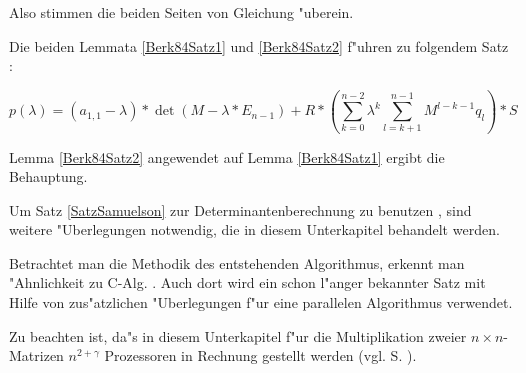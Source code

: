 \begin{beweis}
    Also stimmen die beiden Seiten von Gleichung 
    "uberein.
\end{beweis}

Die beiden Lemmata \ref{Berk84Satz1} und \ref{Berk84Satz2} f"uhren zu
folgendem Satz \cite{Samu42}:

\begin{satz}[Samuelson]
\label{SatzSamuelson}
    \begin{equation}
    \label{EquSatzSamuelson}
        p(\lambda) =
            (a_{1,1} - \lambda) * \det(M - \lambda * E_{n-1})
            + R * \left(
              \sum_{k=0}^{n-2} \lambda^{k} \sum_{l=k+1}^{n-1} M^{l-k-1} q_l
            \right) * S
    \end{equation}
\end{satz}
\begin{beweis}
    Lemma \ref{Berk84Satz2} angewendet auf Lemma \ref{Berk84Satz1}
    ergibt die Behauptung.
\end{beweis}


\label{SecAlgBerk}

Um Satz \ref{SatzSamuelson} zur Determinantenberechnung zu benutzen
\cite{Berk84}, sind weitere "Uberlegungen notwendig, die in diesem
Unterkapitel behandelt werden.

Betrachtet man die Methodik des entstehenden Algorithmus, erkennt man
"Ahnlichkeit zu C-Alg. . Auch dort wird ein schon l"anger bekannter Satz
mit Hilfe von zus"atzlichen "Uberlegungen f"ur eine parallelen Algorithmus
verwendet.

Zu beachten ist, da"s in diesem Unterkapitel f"ur die Multiplikation 
zweier $n \times n$-Matrizen $n^{2+\gamma}$ Prozessoren in Rechnung 
gestellt werden (vgl. S. \pageref{PageAlg2MatMult}).


